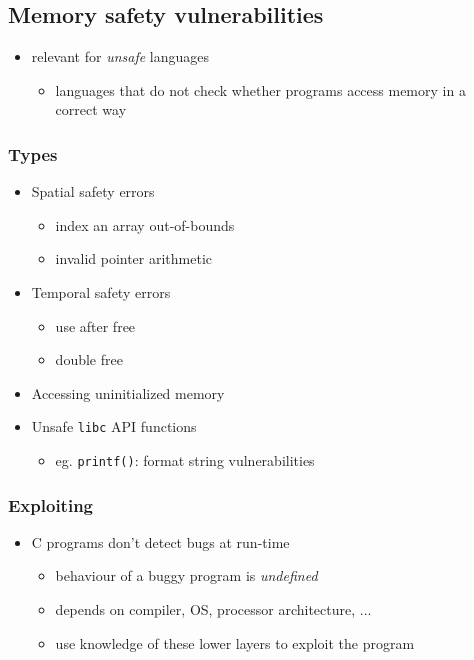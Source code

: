 \documentclass[12pt,titlepage,a4paper]{report}
\begin{document}
	
	\subsection{Memory safety vulnerabilities}
	\begin{itemize}
		\item relevant for \textit{unsafe} languages
		\begin{itemize}
			\item languages that do not check whether programs access memory in a correct way
		\end{itemize}
	\end{itemize}
	
	\subsubsection{Types}
	\begin{itemize}
		\item Spatial safety errors
		\begin{itemize}
			\item index an array out-of-bounds
			\item invalid pointer arithmetic
		\end{itemize}
		\item Temporal safety errors
		\begin{itemize}
			\item use after free
			\item double free
		\end{itemize}
		\item Accessing uninitialized memory
		\item Unsafe \texttt{libc} API functions
		\begin{itemize}
			\item eg. \texttt{printf()}: format string vulnerabilities
		\end{itemize}
	\end{itemize}

	\subsubsection{Exploiting}
	\begin{itemize}
		\item C programs don't detect bugs at run-time
		\begin{itemize}
			\item behaviour of a buggy program is \emph{undefined}
			\item depends on compiler, OS, processor architecture, ...
			\item use knowledge of these lower layers to exploit the program
		\end{itemize}
	\end{itemize}
\end{document}
